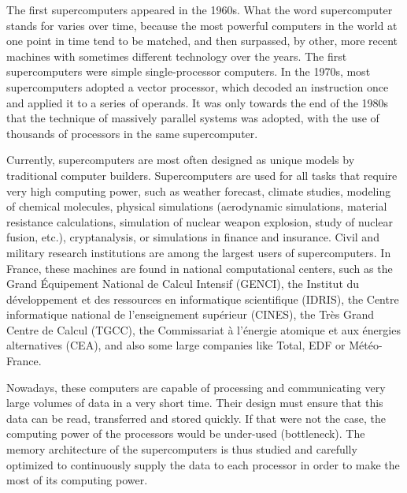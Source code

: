 The first supercomputers appeared in the 1960s. What the word supercomputer stands for varies over time, because the most powerful computers in the world
at one point in time tend to be matched, and then surpassed, by other, more recent machines with sometimes different technology over the years.
The first supercomputers were simple single-processor computers.
In the 1970s, most supercomputers adopted a vector processor, which decoded an instruction once and applied it to a series of operands.
It was only towards the end of the 1980s that the technique of massively parallel systems was adopted, with the use of thousands of processors in the same supercomputer.

Currently, supercomputers are most often designed as unique models by traditional computer builders. Supercomputers are used for all tasks that require very high computing power, such as weather forecast, climate studies, modeling of chemical molecules, physical simulations (aerodynamic simulations, material resistance calculations,
simulation of nuclear weapon explosion, study of nuclear fusion, etc.), cryptanalysis, or simulations in finance and insurance.
Civil and military research institutions are among the largest users of supercomputers.
In France, these machines are found in national computational centers, such as the Grand \'Equipement National de Calcul Intensif (GENCI),
the Institut du d\'eveloppement et des ressources en informatique scientifique (IDRIS), the Centre informatique national de l'enseignement sup\'erieur (CINES),
the Tr\`es Grand Centre de Calcul (TGCC), the Commissariat \`a l'\'energie atomique et aux \'energies alternatives (CEA),
and also some large companies like Total, EDF or M\'et\'eo-France.

Nowadays, these computers are capable of processing and communicating very large volumes of data in a very short time.
Their design must ensure that this data can be read, transferred and stored quickly. If that were not the case, the computing power of the processors would be under-used (bottleneck).
The memory architecture of the supercomputers is thus studied and carefully optimized to continuously supply the data to each processor in order to make the most of its computing power.

